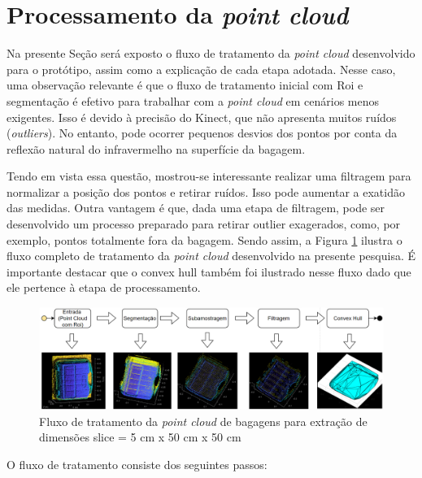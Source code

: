    
    
    

\section{Processamento da \textit{point cloud}}
\label{subsec_Processamento da Point Cloud}

    Na presente Seção será exposto o fluxo de tratamento da \textit{point cloud} desenvolvido para o protótipo, assim como a explicação de cada etapa adotada. Nesse caso, uma observação relevante é que o fluxo de tratamento inicial com Roi e segmentação é efetivo para trabalhar com a \textit{point cloud} em cenários menos exigentes. Isso é devido à precisão do Kinect, que não apresenta muitos ruídos (\textit{outliers}). No entanto, pode ocorrer pequenos desvios dos pontos por conta da reflexão natural do infravermelho na superfície da bagagem.
    
    Tendo em vista essa questão, mostrou-se interessante realizar uma filtragem para normalizar a posição dos pontos e retirar ruídos. Isso pode aumentar a exatidão das medidas. Outra vantagem é que, dada uma etapa de filtragem, pode ser desenvolvido um processo preparado para retirar outlier exagerados, como, por exemplo, pontos totalmente fora da bagagem. Sendo assim, a Figura \ref{fig:fluxoTratamentoPointCloudBagagens} ilustra o fluxo completo de tratamento da \textit{point cloud} desenvolvido na presente pesquisa. É importante destacar que o convex hull também foi ilustrado nesse fluxo dado que ele pertence à etapa de processamento.
    
        \begin{figure}[h]
           \centering
           \includegraphics[width=1\textwidth]{imagens/fluxoTratamentoPointCloudBagagens.png}
           \caption{Fluxo de tratamento da \textit{point cloud} de bagagens para extração de dimensões slice = 5 cm x 50 cm x 50 cm}
          \label{fig:fluxoTratamentoPointCloudBagagens}
        \end{figure}
    
    O fluxo de tratamento consiste dos seguintes passos:
    
